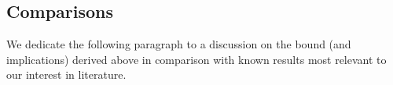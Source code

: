 \documentclass[nohyperref]{article}
\theoremstyle{plain}
\theoremstyle{definition}
\theoremstyle{remark}
\begin{document}


\subsection{Comparisons}

We dedicate the following paragraph to a discussion on the bound (and implications) derived above in comparison with known results most relevant to our interest in literature.
\end{document}
